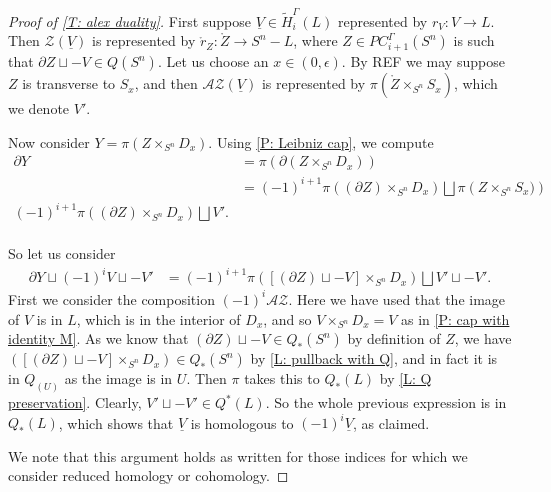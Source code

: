 \documentclass[12pt]{article}
\theoremstyle{plain}
\theoremstyle{definition}
\theoremstyle{remark}
\newcommand{\uV}{\underline{V}}
\newcommand{\td}[1]{\tilde{#1}}
\newcommand{\bd}{\partial}
\newcommand{\mc}[1]{\mathcal{#1}}
\begin{document}
\begin{proof}[Proof of \cref{T: alex duality}]
First suppose $\uV \in \td H_i^\Gamma(L)$ represented by $r_V \colon V \to L$.
Then $\mc Z(\uV)$ is represented by $\mathring r_Z \colon \mathring Z \to S^n-L$, where $Z \in PC_{i+1}^\Gamma(S^n)$ is such that $\bd Z \sqcup -V \in Q(S^n)$.
Let us choose an $x \in (0,\epsilon)$.
By REF we may suppose $Z$ is transverse to $S_x$, and then $\mc A \mc Z(\uV)$ is represented by $\pi(\mathring Z \times_{S^n} S_x)$, which we denote $V'$.

Now consider $Y = \pi(Z \times_{S^n} D_x)$.
Using \cref{P: Leibniz cap}, we compute
\begin{align*}
\bd Y &= \pi\left(\bd(Z \times_{S^n} D_x)\right)\\
& =(-1)^{i+1}\pi\left((\bd Z) \times_{S^n} D_x\right) \bigsqcup \pi\left(Z \times_{S^n} S_x)\right)\\
(-1)^{i+1}\pi\left((\bd Z) \times_{S^n} D_x\right) \bigsqcup V'.\\
\end{align*}

So let us consider
\begin{align*}
\bd Y \sqcup (-1)^{i}V\sqcup -V'&=
(-1)^{i+1}\pi\left([(\bd Z) \sqcup -V] \times_{S^n} D_x\right) \bigsqcup V'\sqcup -V'.
\end{align*}
First we consider the composition $(-1)^i\mc A \mc Z$.
Here we have used that the image of $V$ is in $L$, which is in the interior of $D_x$, and so $V \times_{S^n} D_x = V$ as in \cref{P: cap with identity M}.
As we know that $(\bd Z) \sqcup -V \in Q_*(S^n)$ by definition of $Z$, we have $\left([(\bd Z) \sqcup -V] \times_{S^n} D_x\right) \in Q_*(S^n)$ by \cref{L: pullback with Q}, and in fact it is in $Q_(U)$ as the image is in $U$.
Then $\pi$ takes this to $Q_*(L)$ by \cref{L: Q preservation}.
Clearly, $V'\sqcup -V' \in Q^*(L)$.
So the whole previous expression is in $Q_*(L)$, which shows that $\uV$ is homologous to $(-1)^{i}\uV$, as claimed.

We note that this argument holds as written for those indices for which we consider reduced homology or cohomology.
\end{proof}









\end{document}
